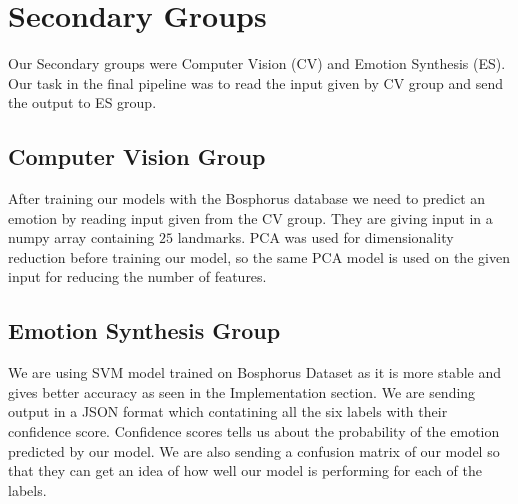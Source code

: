 \section{Secondary Groups}

Our Secondary groups were Computer Vision (CV) and Emotion Synthesis (ES). Our task in the final pipeline was to read the input given by CV group and send the output to ES group.

\subsection{Computer Vision Group}
After training our models with the Bosphorus database we need to predict an emotion by reading input given from the CV group. They are giving input in a numpy array containing $25$ landmarks. PCA was used for dimensionality reduction before training our model, so the same PCA model is used on the given input for reducing the number of features. 

\subsection{Emotion Synthesis Group}
We are using SVM model trained on Bosphorus Dataset as it is more stable and gives better accuracy as seen in the Implementation section. We are sending output in a JSON format which contatining all the six labels with their confidence score. Confidence scores tells us about the probability of the emotion predicted by our model. We are also sending a confusion matrix of our model so that they can get an idea of how well our model is performing for each of the labels.

